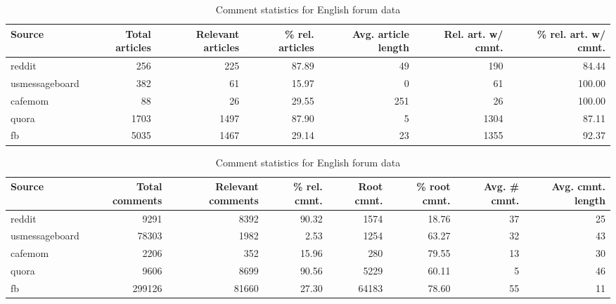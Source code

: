\begin{table}
	\begin{tabular}{lrrrrrr}
		\toprule
		Source         & Total articles & Relevant articles & \% rel. articles & Avg. article length\footnotemark[1] & Rel. art. w/ cmnt. & \% rel. art. w/ cmnt. \\ \midrule
		reddit         &            256 &               225 &            87.89 &                  49 &                190 &                 84.44 \\
		usmessageboard &            382 &                61 &            15.97 &                   0 &                 61 &                100.00 \\
		cafemom        &             88 &                26 &            29.55 &                 251 &                 26 &                100.00 \\
		quora          &           1703 &              1497 &            87.90 &                   5 &               1304 &                 87.11 \\
		fb             &           5035 &              1467 &            29.14 &                  23 &               1355 &                 92.37 \\ \bottomrule
	\end{tabular}
	
	\caption{Article statistics for English forum data} 
	\begin{tabular}{lrrrrrrr}
		\toprule
		Source         & Total comments & Relevant comments & \% rel. cmnt. & Root cmnt. & \% root cmnt. & Avg. \# cmnt. & Avg. cmnt. length\footnotemark[1] \\ \midrule
		reddit         &           9291 &              8392 &         90.32 &       1574 &         18.76 &            37 &                25 \\
		usmessageboard &          78303 &              1982 &          2.53 &       1254 &         63.27 &            32 &                43 \\
		cafemom        &           2206 &               352 &         15.96 &        280 &         79.55 &            13 &                30 \\
		quora          &           9606 &              8699 &         90.56 &       5229 &         60.11 &             5 &                46 \\
		fb             &         299126 &             81660 &         27.30 &      64183 &         78.60 &            55 &                11 \\ \bottomrule
	\end{tabular}
	\caption{Comment statistics for English forum data} 
\end{table}

